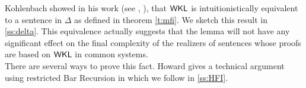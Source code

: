 Kohlenbach showed in his work (see \cite{Kohlenbach92}, \cite{Kohlenbach08}), 
that $\textsf{\upshape WKL}$ is intuitionistically equivalent to a sentence in $\Delta$
as defined in theorem \ref{t:mfi}. We sketch this result in \ref{ss:delta}.
This equivalence actually suggests that the lemma will not have any significant
effect on the final complexity of the realizers of sentences whose proofs 
are based on $\textsf{\upshape WKL}$ in common systems.\\
There are several ways to prove this fact. Howard gives a technical
argument using restricted Bar Recursion in \cite{Howard81} which we
follow in \ref{ss:HFI}. 

%

